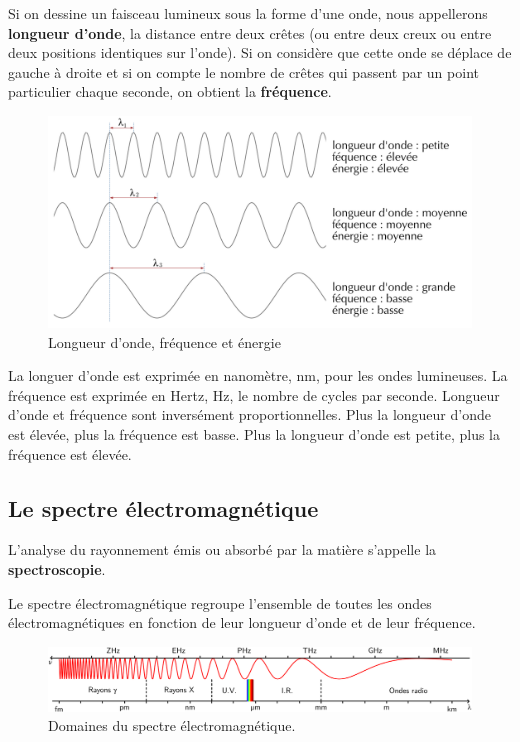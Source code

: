 \documentclass[
  11pt,
  a4paper,
  openany]{book}
\begin{document}
Si on dessine un faisceau lumineux sous la forme d'une onde, nous appellerons \textbf{longueur d'onde}, la distance entre deux crêtes (ou entre deux creux ou entre deux positions identiques sur l'onde). Si on considère que cette onde se déplace de gauche à droite et si on compte le nombre de crêtes qui passent par un point particulier chaque seconde, on obtient la \textbf{fréquence}.

\begin{figure}

{\centering \includegraphics[width=0.75\linewidth]{images/ondes-electromagnetiques} 

}

\caption{Longueur d'onde, fréquence et énergie}\label{fig:ondes-electromagnetiques}
\end{figure}

La longuer d'onde est exprimée en nanomètre, nm, pour les ondes lumineuses. La fréquence est exprimée en Hertz, Hz, le nombre de cycles par seconde. Longueur d'onde et fréquence sont inversément proportionnelles. Plus la longueur d'onde est élevée, plus la fréquence est basse. Plus la longueur d'onde est petite, plus la fréquence est élevée.

\hypertarget{le-spectre-uxe9lectromagnuxe9tique}{%
\subsection{Le spectre électromagnétique}\label{le-spectre-uxe9lectromagnuxe9tique}}

L'analyse du rayonnement émis ou absorbé par la matière s'appelle la \textbf{spectroscopie}.

Le spectre électromagnétique regroupe l'ensemble de toutes les ondes électromagnétiques en fonction de leur longueur d'onde et de leur fréquence.

\begin{figure}

{\centering \includegraphics[width=0.95\linewidth]{images/domaine-spectre-electromagnetique} 

}

\caption{Domaines du spectre électromagnétique.}\label{fig:domaine-spectre-electromagnetique}
\end{figure}
\end{document}
